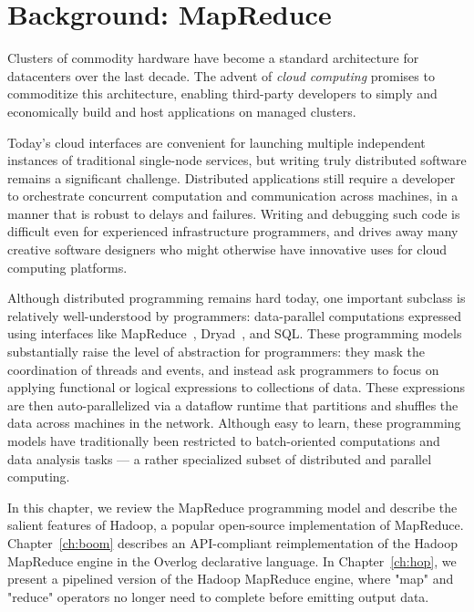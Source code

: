\chapter[Background: MapReduce]{Background: MapReduce}
\label{ch:mrback}

Clusters of commodity hardware have become a standard architecture for
datacenters over the last decade. The advent of \emph{cloud computing} promises to commoditize
this architecture, enabling third-party developers to simply and economically build and host applications on managed clusters.  

Today's cloud interfaces are convenient for launching multiple independent
instances of traditional single-node services, but writing truly distributed
software remains a significant challenge.  Distributed applications still
require a developer to orchestrate concurrent computation and communication
across machines, in a manner that is robust to delays and failures.  Writing and
debugging such code is difficult even for experienced infrastructure
programmers, and drives away many creative software designers who might
otherwise have innovative uses for cloud computing platforms.

Although distributed programming remains hard today, one important subclass is
relatively well-understood by programmers: data-parallel computations expressed
using interfaces like MapReduce~\cite{mapreduce-osdi}, Dryad~\cite{dryad}, and
SQL\@.  These programming models substantially raise the level of abstraction
for programmers: they mask the coordination of threads and events, and instead
ask programmers to focus on applying functional or logical expressions to
collections of data.  These expressions are then auto-parallelized via a
dataflow runtime that partitions and shuffles the data across machines in the
network. Although easy to learn, these programming models have traditionally
been restricted to batch-oriented computations and data analysis tasks --- a
rather specialized subset of distributed and parallel computing.

In this chapter, we review the MapReduce programming model and describe the
salient features of Hadoop, a popular open-source implementation of MapReduce.
Chapter~\ref{ch:boom} describes an API-compliant reimplementation of the Hadoop 
MapReduce engine in the Overlog declarative language. In Chapter~\ref{ch:hop}, we 
present a pipelined version of the Hadoop MapReduce engine, where "map" and "reduce" 
operators no longer need to complete before emitting output data. 

